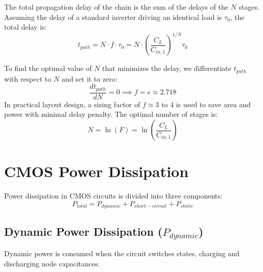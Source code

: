 \documentclass[12pt,a4paper]{article}
\begin{document}
The total propagation delay of the chain is the sum of the delays of the $N$ stages. Assuming the delay of a standard inverter driving an identical load is $\tau_0$, the total delay is:
\begin{equation}
  t_{path} = N \cdot f \cdot \tau_0 = N \cdot \left(\frac{C_L}{C_{in, 1}}\right)^{1/N} \tau_0
\end{equation}

To find the optimal value of $N$ that minimizes the delay, we differentiate $t_{path}$ with respect to $N$ and set it to zero:
\begin{equation}
  \frac{d t_{path}}{d N} = 0 \implies f = e \approx 2.718
\end{equation}
In practical layout design, a sizing factor of $f \approx 3$ to $4$ is used to save area and power with minimal delay penalty. The optimal number of stages is:
\begin{equation}
  N = \ln(F) = \ln\left( \frac{C_L}{C_{in, 1}} \right)
\end{equation}

\section{CMOS Power Dissipation}

Power dissipation in CMOS circuits is divided into three components:
\begin{equation}
  P_{total} = P_{dynamic} + P_{short-circuit} + P_{static}
\end{equation}

\subsection{Dynamic Power Dissipation (\texorpdfstring{$P_{dynamic}$}{P\_dynamic})}
Dynamic power is consumed when the circuit switches states, charging and discharging node capacitances.
\end{document}
